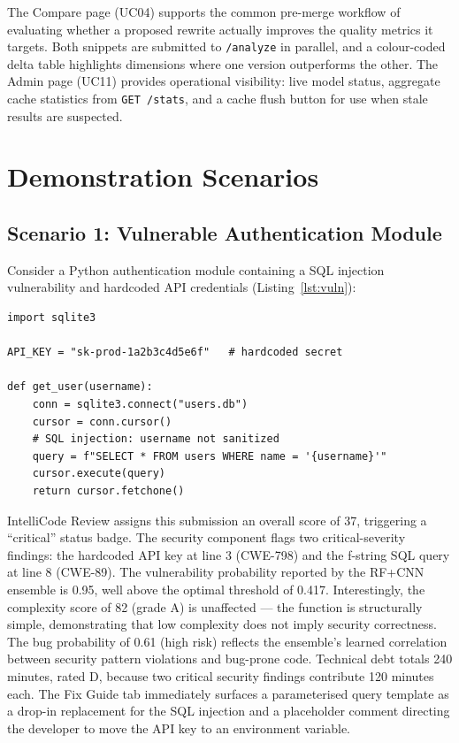\documentclass[12pt, oneside]{report}
\begin{document}
The Compare page (UC04) supports the common pre-merge workflow of evaluating whether
a proposed rewrite actually improves the quality metrics it targets. Both snippets are
submitted to \texttt{/analyze} in parallel, and a colour-coded delta table highlights
dimensions where one version outperforms the other. The Admin page (UC11) provides
operational visibility: live model status, aggregate cache statistics from
\texttt{GET /stats}, and a cache flush button for use when stale results are suspected.

\section{Demonstration Scenarios}
\label{sec:demo-scenarios}

\subsection{Scenario 1: Vulnerable Authentication Module}

Consider a Python authentication module containing a SQL injection vulnerability
and hardcoded API credentials (Listing~\ref{lst:vuln}):

\begin{lstlisting}[caption={Vulnerable code snippet submitted for analysis},
                   label={lst:vuln}, style=pythonstyle]
import sqlite3

API_KEY = "sk-prod-1a2b3c4d5e6f"   # hardcoded secret

def get_user(username):
    conn = sqlite3.connect("users.db")
    cursor = conn.cursor()
    # SQL injection: username not sanitized
    query = f"SELECT * FROM users WHERE name = '{username}'"
    cursor.execute(query)
    return cursor.fetchone()
\end{lstlisting}

IntelliCode Review assigns this submission an overall score of 37, triggering a
``critical'' status badge. The security component flags two critical-severity findings:
the hardcoded API key at line 3 (CWE-798) and the f-string SQL query at line 8
(CWE-89). The vulnerability probability reported by the RF+CNN ensemble is 0.95,
well above the optimal threshold of 0.417. Interestingly, the complexity score of 82
(grade A) is unaffected --- the function is structurally simple, demonstrating that
low complexity does not imply security correctness. The bug probability of 0.61
(high risk) reflects the ensemble's learned correlation between security pattern
violations and bug-prone code. Technical debt totals 240 minutes, rated D, because
two critical security findings contribute 120 minutes each. The Fix Guide tab
immediately surfaces a parameterised query template as a drop-in replacement for the
SQL injection and a placeholder comment directing the developer to move the API key
to an environment variable.
\end{document}
